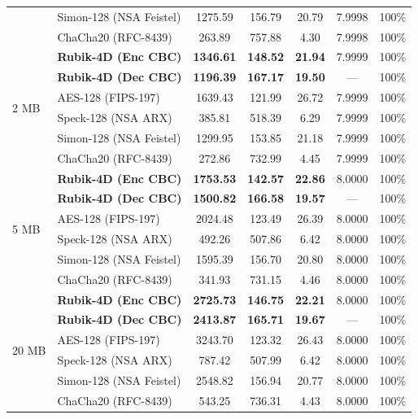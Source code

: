 \begin{table}[t]
\begin{tabular}{@{}llccccc@{}}
 & Simon-128 (NSA Feistel) & 1275.59 & 156.79 & 20.79 & 7.9998 & 100\% \\
 & ChaCha20 (RFC-8439) & 263.89 & 757.88 & 4.30 & 7.9998 & 100\% \\
\midrule
\multirow{6}{*}{2 MB}
 & \textbf{Rubik-4D (Enc CBC)} & \textbf{1346.61} & \textbf{148.52} & \textbf{21.94} & 7.9999 & 100\% \\
 & \textbf{Rubik-4D (Dec CBC)} & \textbf{1196.39} & \textbf{167.17} & \textbf{19.50} & --- & 100\% \\
 & AES-128 (FIPS-197) & 1639.43 & 121.99 & 26.72 & 7.9999 & 100\% \\
 & Speck-128 (NSA ARX) & 385.81 & 518.39 & 6.29 & 7.9999 & 100\% \\
 & Simon-128 (NSA Feistel) & 1299.95 & 153.85 & 21.18 & 7.9999 & 100\% \\
 & ChaCha20 (RFC-8439) & 272.86 & 732.99 & 4.45 & 7.9999 & 100\% \\
\midrule
\multirow{6}{*}{5 MB}
 & \textbf{Rubik-4D (Enc CBC)} & \textbf{1753.53} & \textbf{142.57} & \textbf{22.86} & 8.0000 & 100\% \\
 & \textbf{Rubik-4D (Dec CBC)} & \textbf{1500.82} & \textbf{166.58} & \textbf{19.57} & --- & 100\% \\
 & AES-128 (FIPS-197) & 2024.48 & 123.49 & 26.39 & 8.0000 & 100\% \\
 & Speck-128 (NSA ARX) & 492.26 & 507.86 & 6.42 & 8.0000 & 100\% \\
 & Simon-128 (NSA Feistel) & 1595.39 & 156.70 & 20.80 & 8.0000 & 100\% \\
 & ChaCha20 (RFC-8439) & 341.93 & 731.15 & 4.46 & 8.0000 & 100\% \\
\midrule
\multirow{6}{*}{20 MB}
 & \textbf{Rubik-4D (Enc CBC)} & \textbf{2725.73} & \textbf{146.75} & \textbf{22.21} & 8.0000 & 100\% \\
 & \textbf{Rubik-4D (Dec CBC)} & \textbf{2413.87} & \textbf{165.71} & \textbf{19.67} & --- & 100\% \\
 & AES-128 (FIPS-197) & 3243.70 & 123.32 & 26.43 & 8.0000 & 100\% \\
 & Speck-128 (NSA ARX) & 787.42 & 507.99 & 6.42 & 8.0000 & 100\% \\
 & Simon-128 (NSA Feistel) & 2548.82 & 156.94 & 20.77 & 8.0000 & 100\% \\
 & ChaCha20 (RFC-8439) & 543.25 & 736.31 & 4.43 & 8.0000 & 100\% \\
\bottomrule
\end{tabular}
\end{table}

